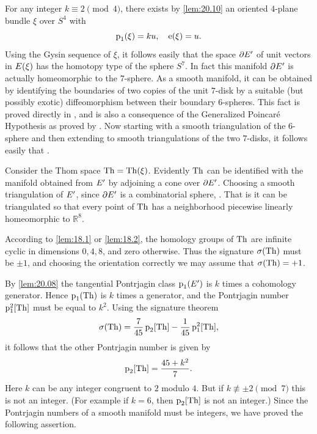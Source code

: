 \documentclass[../main]{subfiles}
\begin{document}
\begin{example} For any integer $k \equiv 2\pmod 4$, there exists by \ref{lem:20.10} an oriented $4$-plane bundle $\xi$ over $S^{4}$ with
\[
\operatorname{p}_{1}(\xi)=ku, \quad \operatorname{e}(\xi)=u .
\]
Using the Gysin sequence of $\xi$, it follows easily that the space $\partial E^{\prime}$ of unit vectors in $E(\xi)$ has the homotopy type of the sphere $S^{7}$. In fact this manifold $\partial E^{\prime}$ is actually homeomorphic to the $7$-sphere. As a smooth manifold, it can be obtained by identifying the boundaries of two copies of the unit $7$-disk by a suitable (but possibly exotic) diffeomorphism between their boundary $6$-spheres. This fact is proved directly in \cite{milnor1956}, and is also a consequence of the Generalized Poincar\'e Hypothesis as proved by \cite{smale1961}. Now starting with a smooth triangulation of the $6$-sphere and then extending to smooth triangulations of the two $7$-disks, it follows easily that .
\end{example}

Consider the Thom space $\operatorname{Th}=\operatorname{Th}(\xi)$. Evidently $\operatorname{Th}$ can be identified with the manifold obtained from $E^{\prime}$ by adjoining a cone over $\partial E^{\prime}$. Choosing a smooth triangulation of $E^{\prime}$, since $\partial E^{\prime}$ is a combinatorial sphere, . That is it can be triangulated so that every point of $\operatorname{Th}$ has a neighborhood piecewise linearly homeomorphic to $\mathbb{R}^{8}$.

According to \ref{lem:18.1} or \ref{lem:18.2}, the homology groups of $\operatorname{Th}$ are infinite cyclic in dimensions $0,4,8$, and zero otherwise. Thus the signature $\sigma(\operatorname{Th})$ must be $\pm 1$, and choosing the orientation correctly we may assume that $\sigma(\operatorname{Th})=+1$.

By \ref{lem:20.08} the tangential Pontrjagin class $\operatorname{p}_{1}(E^{\prime})$ is $k$ times a cohomology generator. Hence $\operatorname{p}_{1}(\operatorname{Th})$ is $k$ times a generator, and the Pontrjagin number $\operatorname{p}_{1}^{2}[\operatorname{Th}]$ must be equal to $k^{2}$. Using the signature theorem
\[
\sigma(\operatorname{Th})=\frac{7}{45} \operatorname{p}_{2}[\operatorname{Th}]-\frac{1}{45} \operatorname{p}_{1}^{2}[\operatorname{Th}],
\]
it follows that the other Pontrjagin number is given by
\[
\operatorname{p}_{2}[\operatorname{Th}]=\dfrac{45+k^{2}}{7} .
\]
Here $k$ can be any integer congruent to $2$ modulo $4$. But if $k \not\equiv \pm 2\pmod{7}$ this is not an integer. (For example if $k=6$, then $\operatorname{p}_{2}[\operatorname{Th}]$ is not an integer.) Since the Pontrjagin numbers of a smooth manifold must be integers, we have proved the following assertion.
\end{document}
